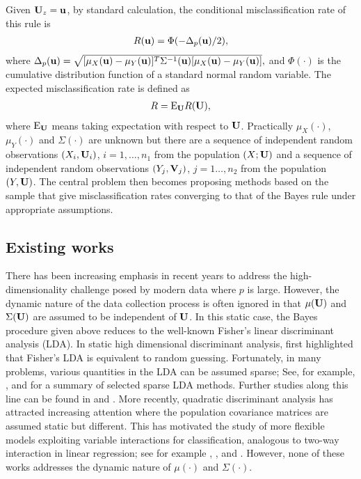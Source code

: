 \documentclass[11pt]{article}
\theoremstyle{definition}
\begin{document}
 Given ${\bf U}_z={\bf u}$, by standard calculation, the conditional misclassification rate of this rule is
 \begin{eqnarray}\label{R}
 	R({\bf u})=\Phi(-\Delta_p({\bf u})/2),
 \end{eqnarray}
 where $\Delta_p({\bf u})=\sqrt{[\mu_X({\bf u})-\mu_Y({\bf u})]^T\Sigma^{-1}({\bf u})[\mu_X({\bf u})-\mu_Y({\bf u})]},$
 and $\Phi(\cdot)$ is the cumulative distribution function of a standard normal random variable. The expected misclassification rate is defined as
 \begin{eqnarray}\label{ER}
 	R={\rm E}_{\bf U}R({\bf U}),
 \end{eqnarray}
 where ${\rm E}_{\bf U}$ means taking expectation with respect to ${\bf U}$.
 Practically $\mu_X(\cdot)$, $\mu_Y(\cdot)$ and $\Sigma(\cdot)$ are unknown but there are a sequence of independent random observations $(X_i,{\bf U}_i)$, $i=1,\ldots, n_1$ from the population $(X; {\bf U})$ and a sequence of independent random observations $(Y_j, {\bf V}_j)$, $j=1\ldots, n_2$ from the population $(Y, {\bf U})$.  The central problem then becomes proposing methods based on the sample that give misclassification rates converging to that of the Bayes rule under appropriate assumptions.
 
 \subsection{Existing works}
 There has been increasing emphasis in recent years to address the
 high-dimensionality challenge posed by modern data where $p$ is large. However, the dynamic
 nature of the data collection process is often ignored in that $\mu({\bf U})$ and
 $\Sigma({\bf U})$ are assumed to be independent of ${\bf U}$.
 In this static case, the Bayes procedure given above reduces to the well-known Fisher's linear discriminant analysis (LDA).
 In static high dimensional discriminant analysis, \cite{Bickel2004} first highlighted that Fisher's LDA is equivalent to random guessing. Fortunately, in many
 problems, various quantities in the LDA can be assumed sparse; See, for example, \cite{Witten:Tibs:2011,Shao,Cai,Fan2012,Maiqing2012}, and \cite{Mai:Zou:2013} for a summary of selected sparse LDA methods. Further studies along this line can be found in \cite{Fan:etal:2013} and \cite{Hao:etal:2015}. More recently,  quadratic discriminant analysis has attracted increasing attention where the population covariance matrices are assumed static but different. This has motivated the study of more flexible models exploiting variable interactions for classification, analogous to two-way interaction in linear regression; see for example \cite{Fan:etal:2015}, \cite{Fan:etal:2015a}, and \cite{Jiang:etal:2015}. However, none of these works addresses the dynamic nature of $\mu(\cdot)$ and $\Sigma(\cdot)$.
 
\end{document}
